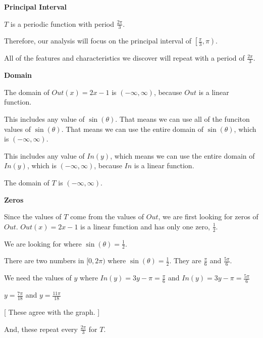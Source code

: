 \documentclass{ximera}
\begin{document}
\begin{observation} \textbf{\textcolor{-red!75}{Principal Interval}}

$T$ is a periodic function with period $\frac{2\pi}{3}$. 


Therefore, our analysis will focus on the principal interval of $\left[ \frac{\pi}{3}, \pi \right)$. 


All of the features and characteristics we discover will repeat with a period of $\frac{2\pi}{3}$.


\end{observation}









\textbf{\textcolor{blue!55!black}{Domain}}


The domain of $Out(x) = 2x - 1$ is $(-\infty, \infty)$, because $Out$ is a linear function.  

This includes any value of $\sin(\theta)$. That means we can use all of the funciton values of $\sin(\theta)$. That means we can use the entire domain of $\sin(\theta)$, which is $(-\infty, \infty)$.  


This includes any value of $In(y)$, which means we can use the entire domain of $In(y)$, which is $(-\infty, \infty)$, because $In$ is a linear function.  


The domain of $T$ is $(-\infty, \infty)$. 








\textbf{\textcolor{blue!55!black}{Zeros}}


Since the values of $T$ come from the values of $Out$, we are first looking for zeros of $Out$.  $Out(x) = 2x - 1$ is a linear function and has only one zero, $\frac{1}{2}$. 

We are looking for where $\sin(\theta) = \frac{1}{2}$. 


There are two numbers in $[0, 2\pi)$ where $\sin(\theta) = \frac{1}{2}$.  They are $\frac{\pi}{6}$ and $\frac {5\pi}{6}$.

We need the values of $y$ where $In(y) = 3y - \pi = \frac{\pi}{6}$ and $In(y) = 3y - \pi = \frac{5\pi}{6}$

$y = \frac{7\pi}{18}$  and   $y = \frac{11\pi}{18}$

[ These agree with the graph. ]


And, these repeat every $\frac{2\pi}{3}$ for $T$.
\end{document}
